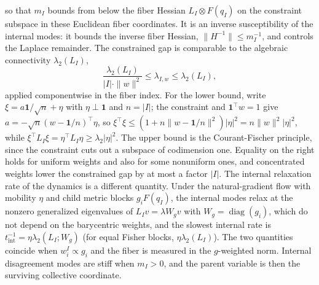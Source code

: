 so that $m_I$ bounds from below the fiber Hessian $L_I\otimes F(q_I)$ on the constraint subspace in these Euclidean fiber coordinates. It is an inverse susceptibility of the internal modes: it bounds the inverse fiber Hessian, $\|H^{-1}\|\le m_I^{-1}$, and controls the Laplace remainder. The constrained gap is comparable to the algebraic connectivity $\lambda_2(L_I)$,
\begin{equation}
\frac{\lambda_2(L_I)}{|I|\cdot\|w\|^2}\le\lambda_{I,w}\le\lambda_2(L_I),
\label{eq:rg_gap_interlacing}
\end{equation}
applied componentwise in the fiber index. For the lower bound, write $\xi=a\mathbf{1}/\sqrt{n}+\eta$ with $\eta\perp\mathbf{1}$ and $n=|I|$; the constraint and $\mathbf{1}^\top w=1$ give $a=-\sqrt{n}(w-\mathbf{1}/n)^\top\eta$, so $\xi^\top\xi\le(1+n\|w-\mathbf{1}/n\|^2)|\eta|^2=n\|w\|^2|\eta|^2$, while $\xi^\top L_I\xi=\eta^\top L_I\eta\ge\lambda_2|\eta|^2$. The upper bound is the Courant-Fischer principle, since the constraint cuts out a subspace of codimension one. Equality on the right holds for uniform weights and also for some nonuniform ones, and concentrated weights lower the constrained gap by at most a factor $|I|$. The internal relaxation rate of the dynamics is a different quantity. Under the natural-gradient flow with mobility $\eta$ and child metric blocks $g_iF(q_I)$, the internal modes relax at the nonzero generalized eigenvalues of $L_Iv=\lambda W_gv$ with $W_g=\operatorname{diag}(g_i)$, which do not depend on the barycentric weights, and the slowest internal rate is $t_{\mathrm{int}}^{-1}=\eta\lambda_2(L_I;W_g)$ (for equal Fisher blocks, $\eta\lambda_2(L_I)$). The two quantities coincide when $w_i^I\propto g_i$ and the fiber is measured in the $g$-weighted norm. Internal disagreement modes are stiff when $m_I > 0$, and the parent variable is then the surviving collective coordinate.

